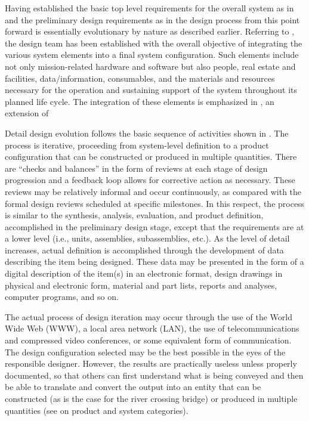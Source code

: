 Having established the basic top level requirements for the overall system as in and the preliminary design requirements as in the design process from this point forward is essentially evolutionary by nature as described earlier. Referring to , the design team has been established with the overall objective of integrating the various system elements into a final system configuration. Such elements include not only mission-related hardware and software but also people, real estate and facilities, data/information, consumables, and the materials and resources necessary for the operation and sustaining support of the system throughout its planned life cycle. The integration of these elements is emphasized in , an extension of 

Detail design evolution follows the basic sequence of activities shown in . The process is iterative, proceeding from system-level definition to a product configuration that can be constructed or produced in multiple quantities. There are “checks and balances” in the form of reviews at each stage of design progression and a feedback loop allows for corrective action as necessary. These reviews may be relatively informal and occur continuously, as compared with the formal design reviews scheduled at specific milestones. In this respect, the process is similar to the synthesis, analysis, evaluation, and product definition, accomplished in the preliminary design stage, except that the requirements are at a lower level (i.e., units, assemblies, subassemblies, etc.). As the level of detail increases, actual definition is accomplished through the development of data describing the item being designed. These data may be presented in the form of a digital description of the item(s) in an electronic format, design drawings in physical and electronic form, material and part lists, reports and analyses, computer programs, and so on.

The actual process of design iteration may occur through the use of the World Wide Web (WWW), a local area network (LAN), the use of telecommunications and compressed video conferences, or some equivalent form of communication. The design configuration selected may be the best possible in the eyes of the responsible designer. However, the results are practically useless unless properly documented, so that others can first understand what is being conveyed and then be able to translate and convert the output into an entity that can be constructed (as is the case for the river crossing bridge) or produced in multiple quantities (see on product and system categories).

